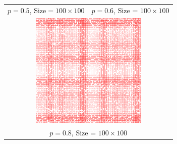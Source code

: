 \documentclass[a4paper,11pt]{article}
\theoremstyle{plain}
\theoremstyle{definition}
\theoremstyle{remark}
\begin{document}
\begin{figure}
\begin{tabular}{cc}
$p = 0.5$, $\text{Size} = 100 \times 100$ & $p = 0.6$, Size = $100 \times 100$  \\[6pt]
\multicolumn{2}{c}{\includegraphics[width=55mm]{p80} }\\
\multicolumn{2}{c}{$p = 0.8$, Size = $100 \times 100$}
\end{tabular}
\end{figure}

\medskip

\newpage
\printbibliography[heading=bibintoc,title={References}]
\end{document}
